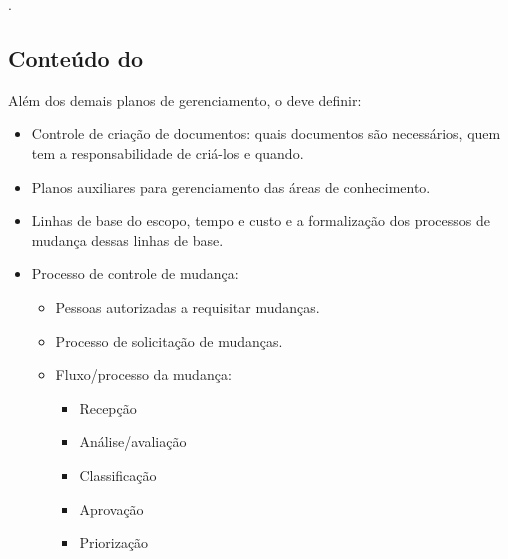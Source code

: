 \planproj.

\subsection{Conteúdo do \planproj}

Além dos demais planos de gerenciamento, o \planproj deve definir:

\begin{itemize}

\item Controle de criação de documentos: quais documentos são necessários, quem tem a responsabilidade de criá-los e quando.

\item Planos auxiliares para gerenciamento das áreas de conhecimento.

\item Linhas de base do escopo, tempo e custo e a formalização dos processos de mudança dessas linhas de base.

\item Processo de controle de mudança:

	\begin{itemize}

	\item Pessoas autorizadas a requisitar mudanças.

	\item Processo de solicitação de mudanças.

	\item Fluxo/processo da mudança:

		\begin{itemize}

		\item Recepção
		\item Análise/avaliação
		\item Classificação
		\item Aprovação
		\item Priorização

		\end{itemize}

\end{itemize}

\end{itemize}
